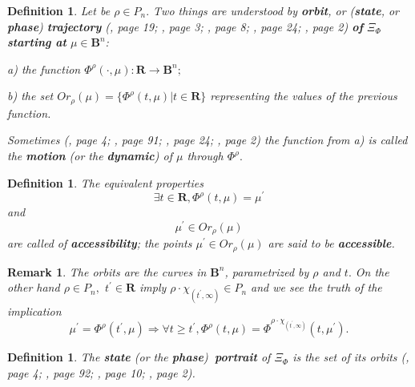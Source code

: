\documentclass[12pt]{article}\usepackage{amsmath}
\newtheorem{definition}[theorem]{Definition}
\newtheorem{remark}[theorem]{Remark}
\begin{document}
\begin{definition}
Let be $\rho\in P_{n}.$ Two things are understood by \textbf{orbit}, or
(\textbf{state}, or \textbf{phase}) \textbf{trajectory} (\cite{bib4}, page 19;
\cite{bib3}, page 3; \cite{bib1}, page 8; \cite{bib2}, page 24; \cite{bib5},
page 2) \textbf{of} $\Xi_{\Phi}$ \textbf{starting at} $\mu\in\mathbf{B}^{n}$:

a) the function $\Phi^{\rho}(\cdot,\mu):\mathbf{R}\rightarrow\mathbf{B}^{n};$

b) the set $Or_{\rho}(\mu)=\{\Phi^{\rho}(t,\mu)|t\in\mathbf{R}\}$ representing
the values of the previous function.

Sometimes (\cite{bib3}, page 4; \cite{bib6}, page 91; \cite{bib2}, page 24;
\cite{bib5}, page 2) the function from a) is called the \textbf{motion} (or
the \textbf{dynamic}) of $\mu$ through $\Phi^{\rho}.$
\end{definition}

\begin{definition}
The equivalent properties
\[
\exists t\in\mathbf{R},\Phi^{\rho}(t,\mu)=\mu^{\prime}\]
and
\[
\mu^{\prime}\in Or_{\rho}(\mu)
\]
are called of \textbf{accessibility}; the points $\mu^{\prime}\in Or_{\rho
}(\mu)$ are said to be \textbf{accessible}.
\end{definition}

\begin{remark}
\label{Rem32}The orbits are the curves in $\mathbf{B}^{n}$, parametrized by
$\rho$ and $t.$ On the other hand $\rho\in P_{n},$ $t^{\prime}\in\mathbf{R}$
imply $\rho\cdot\chi_{(t^{\prime},\infty)}\in P_{n}$ and we see the truth of
the implication\[
\mu^{\prime}=\Phi^{\rho}(t^{\prime},\mu)\Longrightarrow\forall t\geq
t^{\prime},\Phi^{\rho}(t,\mu)=\Phi^{\rho\cdot\chi_{(t^{\prime},\infty)}}(t,\mu^{\prime}).
\]

\end{remark}

\begin{definition}
The \textbf{state} (or the \textbf{phase})\textbf{\ portrait} of $\Xi_{\Phi}$
is the set of its orbits (\cite{bib3}, page 4; \cite{bib6}, page 92;
\cite{bib1}, page 10; \cite{bib5}, page 2).
\end{definition}
\end{document}
